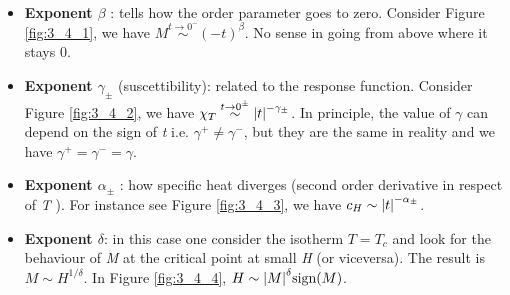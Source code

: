 \documentclass[../main/main.tex]{subfiles}
\begin{document}
\begin{bluebox}
\begin{definition}\
\begin{itemize}
\item \textbf{Exponent \( \beta \) }: tells how the order parameter goes to zero.
Consider Figure \ref{fig:3_4_1}, we have \( M \overset{t \rightarrow  0^-}{\sim} (-t)^{\beta }  \). No sense in going from above where it stays 0.

\item \textbf{Exponent \( \gamma _{\pm}  \) } (suscettibility): related to the response function. Consider Figure \ref{fig:3_4_2}, we have \( \chi _T \overset{t \rightarrow 0^{\pm}}{\sim} \abs{t}^{-\gamma _{\pm} }   \). In principle, the value of \( \gamma   \) can depend on the sign of \emph{t} i.e.   \( \gamma ^+ \neq \gamma ^-  \), but they are the same in reality and we have \( \gamma ^+ = \gamma ^- = \gamma     \).

\item \textbf{Exponent \( \alpha _{\pm} \) }: how specific heat diverges (second order derivative in respect of \emph{T} ). For instance see Figure \ref{fig:3_4_3}, we have \( c_H \sim \abs{t}^{-\alpha _{\pm}}  \).

\item \textbf{Exponent \( \delta   \)}: in this case one consider the isotherm \( T =T_c \) and look for the behaviour of \emph{M} at the critical point at small \emph{H} (or viceversa).  The result is \( M \sim H^{1/\delta } \).
In Figure \ref{fig:3_4_4}, \( H \sim \abs{M}^{\delta } \text{sign} (M)  \).

\end{itemize}
\end{definition}
\end{bluebox}
\end{document}
